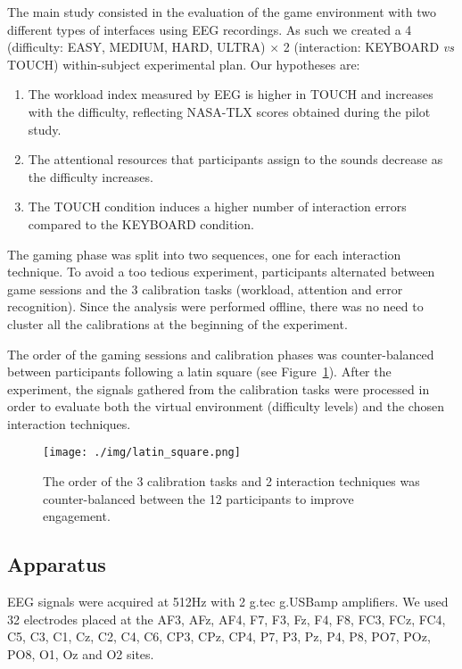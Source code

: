 \documentclass[]{sigchi}
\begin{document}
The main study consisted in the evaluation of the game environment with
two different types of interfaces using EEG recordings. As such we
created a 4 (difficulty: EASY, MEDIUM, HARD, ULTRA) $\times$ 2
(interaction: KEYBOARD \emph{vs} TOUCH) within-subject experimental
plan. Our hypotheses are:

\begin{enumerate}
\def\labelenumi{\arabic{enumi}.}
\itemsep1pt\parskip0pt
\item
  The workload index measured by EEG is higher in TOUCH and increases
  with the difficulty, reflecting NASA-TLX scores obtained during the
  pilot study.
\item
  The attentional resources that participants assign to the sounds
  decrease as the difficulty increases.
\item
  The TOUCH condition induces a higher number of interaction errors
  compared to the KEYBOARD condition.
\end{enumerate}

The gaming phase was split into two sequences, one for each interaction
technique. To avoid a too tedious experiment, participants alternated
between game sessions and the 3 calibration tasks (workload, attention
and error recognition). Since the analysis were performed offline, there
was no need to cluster all the calibrations at the beginning of the
experiment.

The order of the gaming sessions and calibration phases was
counter-balanced between participants following a latin square (see
Figure~\ref{fig:latin}). After the experiment, the signals gathered from
the calibration tasks were processed in order to evaluate both the
virtual environment (difficulty levels) and the chosen interaction
techniques.

\begin{figure}
\centering
\texttt{[image: ./img/latin\_square.png]}
\caption{The order of the 3 calibration tasks and 2 interaction
techniques was counter-balanced between the 12 participants to improve
engagement.}\label{fig:latin}
\end{figure}

\subsection{Apparatus}\label{apparatus}

EEG signals were acquired at 512Hz with 2 g.tec g.USBamp amplifiers. We
used 32 electrodes placed at the AF3, AFz, AF4, F7, F3, Fz, F4, F8, FC3,
FCz, FC4, C5, C3, C1, Cz, C2, C4, C6, CP3, CPz, CP4, P7, P3, Pz, P4, P8,
PO7, POz, PO8, O1, Oz and O2 sites.
\end{document}
